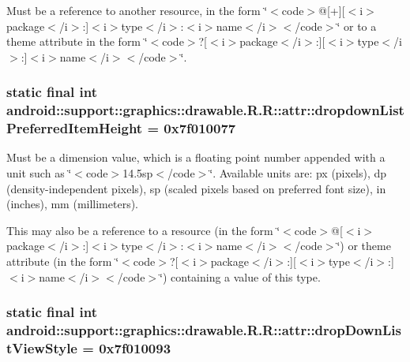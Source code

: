 Must be a reference to another resource, in the form \char`\"{}$<$code$>$@\mbox{[}+\mbox{]}\mbox{[}$<$i$>$package$<$/i$>$:\mbox{]}$<$i$>$type$<$/i$>$:$<$i$>$name$<$/i$>$$<$/code$>$\char`\"{} or to a theme attribute in the form \char`\"{}$<$code$>$?\mbox{[}$<$i$>$package$<$/i$>$:\mbox{]}\mbox{[}$<$i$>$type$<$/i$>$:\mbox{]}$<$i$>$name$<$/i$>$$<$/code$>$\char`\"{}. \hypertarget{classandroid_1_1support_1_1graphics_1_1drawable_1_1_r_1_1attr_2ba99b91ae78faad98f3e24ad3071bbf}{
\subsubsection[{dropdownListPreferredItemHeight}]{\setlength{\rightskip}{0pt plus 5cm}static final int android::support::graphics::drawable.R.R::attr::dropdownListPreferredItemHeight = 0x7f010077}}
\label{classandroid_1_1support_1_1graphics_1_1drawable_1_1_r_1_1attr_2ba99b91ae78faad98f3e24ad3071bbf}


Must be a dimension value, which is a floating point number appended with a unit such as \char`\"{}$<$code$>$14.5sp$<$/code$>$\char`\"{}. Available units are: px (pixels), dp (density-independent pixels), sp (scaled pixels based on preferred font size), in (inches), mm (millimeters). 

This may also be a reference to a resource (in the form \char`\"{}$<$code$>$@\mbox{[}$<$i$>$package$<$/i$>$:\mbox{]}$<$i$>$type$<$/i$>$:$<$i$>$name$<$/i$>$$<$/code$>$\char`\"{}) or theme attribute (in the form \char`\"{}$<$code$>$?\mbox{[}$<$i$>$package$<$/i$>$:\mbox{]}\mbox{[}$<$i$>$type$<$/i$>$:\mbox{]}$<$i$>$name$<$/i$>$$<$/code$>$\char`\"{}) containing a value of this type. \hypertarget{classandroid_1_1support_1_1graphics_1_1drawable_1_1_r_1_1attr_0102e00a3401d498ed9a67e02c07e9c9}{
\subsubsection[{dropDownListViewStyle}]{\setlength{\rightskip}{0pt plus 5cm}static final int android::support::graphics::drawable.R.R::attr::dropDownListViewStyle = 0x7f010093}}
\label{classandroid_1_1support_1_1graphics_1_1drawable_1_1_r_1_1attr_0102e00a3401d498ed9a67e02c07e9c9}


